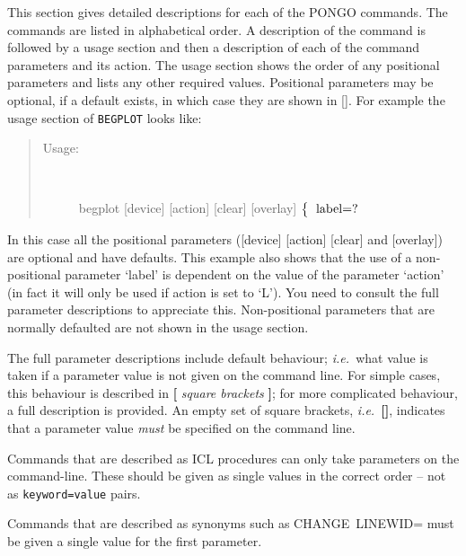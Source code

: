 \documentclass[twoside,11pt]{article}
\newcommand{\htmlref}[2]{#1}
\renewcommand{\_}{\texttt{\symbol{95}}}
\newcommand{\ie}{{\em i.e.\ }}
\newcommand{\cnam}[1]{{\tt #1}}
\newcommand{\iref} [1]{\htmlref{#1}{#1}}
\newcommand{\sstusage}[1]{\item[Usage:] \mbox{}
\\[1.3ex]{\raggedright \ssttt #1}}
\newcommand{\sstusage}[1]{\item[Usage:]
      \begin{description}
         {\ssttt #1}
      \end{description}
      \\
   }
\begin{document}
This section gives detailed descriptions for each of the PONGO
commands.  The commands are listed in alphabetical order.  A
description of the command is followed by a usage section and then a
description of each of the command parameters and its action.  The
usage section shows the order of any positional parameters and lists
any other required values. Positional parameters may be optional, if
a default exists, in which case they are shown in [].  For example the usage
section of \cnam{\iref{BEGPLOT}} looks like:
\begin{quote}
\begin{description}
\sstusage{
      begplot [device] [action] [clear] [overlay]
        \newline\hspace*{1.5em}
        $\left\{ {\begin{tabular}{l}
                                      label=? \\
                  \end{tabular} }
        \right.$
        \newline\hspace*{1.9em}
        \makebox[0mm][c]{\small action}
   }
\end{description}
\end{quote}
In this case all the positional parameters ([device] [action] [clear]
and [overlay]) are optional and have defaults. This example also
shows that the use of a non-positional parameter `label' is dependent on
the value of the parameter `action' (in fact it will only be used if
action is set to `L'). You need to consult the full parameter
descriptions to appreciate this. Non-positional parameters that are
normally defaulted are not shown in the usage section.

The full parameter descriptions include default behaviour; \ie what
value is taken if a parameter value is not given on the command line.
For simple cases, this behaviour is described in {\bf[} {\em square
brackets} {\bf]}; for more complicated behaviour, a full description
is provided.  An empty set of square brackets, \ie {\bf []}, indicates
that a parameter value {\em must} be specified on the command line.

Commands that are described as ICL procedures can only take
parameters on the command-line. These should be given as single
values in the correct order -- not as \verb+keyword=value+ pairs.

Commands that are described as synonyms such as \iref{CHANGE}~LINEWID=
must be given a single value for the first parameter.
\end{document}

